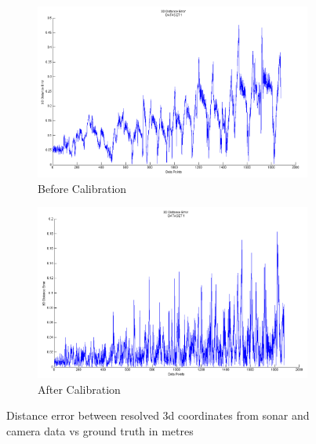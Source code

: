\documentclass[a4paper]{IEEEtran}
\begin{document}
\begin{figure}%
\centering
\begin{subfigure}{\columnwidth}
\includegraphics[width=\columnwidth]{3}%
\caption{Before Calibration}%
\label{subfiga}%
\end{subfigure}\hfill%
\begin{subfigure}{\columnwidth}
\includegraphics[width=\columnwidth]{6}%
\caption{After Calibration}%
\label{subfiga}%
\end{subfigure}\hfill%
\caption{Distance error between resolved 3d coordinates from sonar and camera data vs ground truth in metres}
\label{figabc}
\end{figure}
\end{document}
